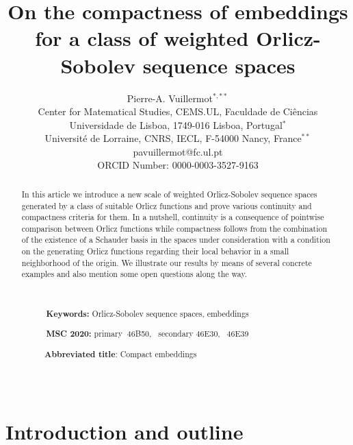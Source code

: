 \documentclass{article}
\begin{document}
\title{On the compactness of embeddings for a class of weighted
Orlicz-Sobolev sequence spaces}
\author{Pierre-A. Vuillermot$^{\ast ,\ast \ast }$ \\
Center for Matematical Studies, CEMS.UL, Faculdade de Ci\^{e}ncias\\
Universidade de Lisboa, 1749-016 Lisboa, Portugal$^{\ast }$\\
Universit\'{e} de Lorraine, CNRS, IECL, F-54000 Nancy, France$^{\ast \ast }$%
\\
pavuillermot@fc.ul.pt\\
ORCID Number: 0000-0003-3527-9163}
\date{}
\maketitle

\begin{abstract}
In this article we introduce a new scale of weighted Orlicz-Sobolev sequence
spaces generated by a class of suitable Orlicz functions and prove various
continuity and compactness criteria for them. In a nutshell, continuity is a
consequence of pointwise comparison between Orlicz functions while
compactness follows from the combination of the existence of a Schauder
basis in the spaces under consideration with a condition on the generating
Orlicz functions regarding their local behavior in a small neighborhood of
the origin. We illustrate our results by means of several concrete examples
and also mention some open questions along the way.

\ \ 

\ \ \ \ \ \ \textbf{Keywords: }Orlicz-Sobolev sequence spaces, embeddings

\ \ \ \ \ \ \textbf{MSC 2020: }primary\textbf{\ }46B50, \ secondary 46E30, \
46E39

\ \textbf{\ \ \ \ Abbreviated title}: Compact embeddings

\ \ 
\end{abstract}

\section{Introduction and outline}
\end{document}
